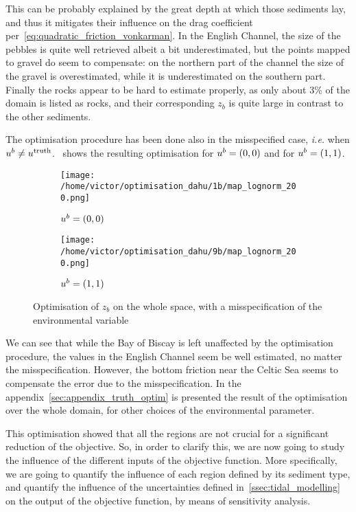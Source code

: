 \documentclass[../../Main_ManuscritThese.tex]{subfiles}
\newcommand{\zob}{z_b}
\begin{document}
This can be probably explained by the great depth at which those
sediments lay, and thus it mitigates their influence on the drag
coefficient per~\cref{eq:quadratic_friction_vonkarman}. In the English
Channel, the size of the pebbles is quite well retrieved albeit a bit
underestimated, but the points mapped to gravel do seem to compensate:
on the northern part of the channel the size of the gravel is
overestimated, while it is underestimated on the southern part.
Finally the rocks appear to be hard to estimate properly, as only about
3\% of the domain is listed as rocks, and their corresponding $\zob$
is quite large in contrast to the other sediments.


\clearpage
The optimisation procedure has been done also in the misspecified
case, \emph{i.e.} when
$u^b \neq u^{\mathrm{truth}}$.~
shows the resulting optimisation for $\uu^b=(0, 0) $ and for
$\uu^b=(1, 1)$.
\begin{figure}[ht]
  \centering
  \begin{subfigure}{0.9\textwidth}
    \centering
  \texttt{[image: /home/victor/optimisation\_dahu/1b/map\_lognorm\_200.png]}
  \caption[Optimisation of $\zob$ on the whole space,
  $\uu^b = (0, 0)$]{\label{fig:optimization_1b} $\uu^b=(0, 0)$}
\end{subfigure}
\begin{subfigure}{0.9\textwidth}
  \centering
  \texttt{[image: /home/victor/optimisation\_dahu/9b/map\_lognorm\_200.png]}
  \caption[Optimisation of $\zob$ on the whole
  space, $\uu^b = (1, 1)$]{\label{fig:optimization_9b} $\uu^b=(1, 1)$}
\end{subfigure}
\caption[Optimisation of $\zob$, misspecified case]{\label{fig:optim_croco_misspecified} Optimisation of $\zob$ on the whole space, with a
  misspecification of the environmental variable}
\end{figure}

 We can see that while the Bay of Biscay is
left unaffected by the optimisation procedure, the values in the
English Channel seem be well estimated, no matter the
misspecification. However, the bottom friction near the Celtic Sea
seems to compensate the error due to the misspecification. In the
appendix~\cref{sec:appendix_truth_optim} is presented the result of
the optimisation over the whole domain, for other choices of the
environmental parameter.


This optimisation showed that all the regions are not crucial for a
significant reduction of the objective. So, in order to clarify this,
we are now going to study the influence of the different inputs of the
objective function. More specifically, we are going to quantify the
influence of each region defined by its sediment type, and quantify
the influence of the uncertainties defined
in~\cref{ssec:tidal_modelling} on the output of the objective
function, by means of sensitivity analysis.
\end{document}
